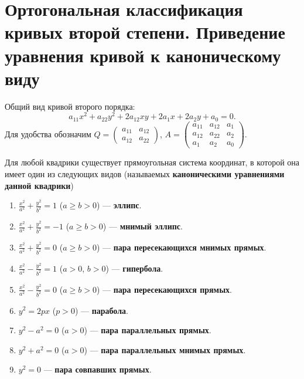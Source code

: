 \section{Ортогональная классификация кривых второй степени. Приведение уравнения кривой к каноническому виду}

Общий вид кривой второго порядка:
$$
a_{11}x^2 + a_{22}y^2 + 2a_{12}xy + 2a_1x + 2a_2y + a_0 = 0.
$$
Для удобства обозначим $Q =
\begin{pmatrix}
    a_{11} & a_{12}\\
    a_{12} & a_{22}
\end{pmatrix}$, $A =
\begin{pmatrix}
    a_{11} & a_{12} & a_1\\
    a_{12} & a_{22} & a_2\\
    a_1 & a_2 & a_0
\end{pmatrix}.$

\begin{theorem}
    Для любой квадрики существует прямоугольная система координат, в которой она имеет один из следующих видов (называемых \textbf{каноническими уравнениями данной квадрики})
    \begin{enumerate}
        \item $\displaystyle\frac{x^2}{a^2} + \frac{y^2}{b^2} = 1$ ($a \geqslant b > 0$) --- \textbf{эллипс}.
        \item $\displaystyle\frac{x^2}{a^2} + \frac{y^2}{b^2} = -1$ ($a \geqslant b > 0$) --- \textbf{мнимый эллипс}.
        \item $\displaystyle\frac{x^2}{a^2} + \frac{y^2}{b^2} = 0$ ($a \geqslant b > 0$) --- \textbf{пара пересекающихся мнимых прямых}.
        \item $\displaystyle\frac{x^2}{a^2} - \frac{y^2}{b^2} = 1$ ($a > 0$, $b > 0$) --- \textbf{гипербола}.
        \item $\displaystyle\frac{x^2}{a^2} - \frac{y^2}{b^2} = 0$ ($a \geqslant b > 0$) --- \textbf{пара пересекающихся прямых}.
        \item $y^2 = 2px$ ($p > 0$) --- \textbf{парабола}.
        \item $y^2 - a^2 = 0$ ($a > 0$) --- \textbf{пара параллельных прямых}.
        \item $y^2 + a^2 = 0$ ($a > 0$) --- \textbf{пара параллельных мнимых прямых}.
        \item $y^2 = 0$ --- \textbf{пара совпавших прямых}.
    \end{enumerate}
\end{theorem}

